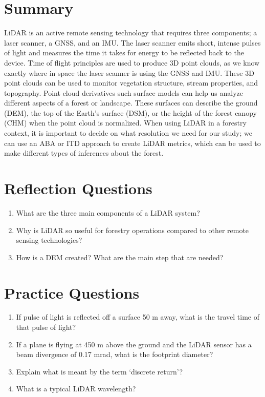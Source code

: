\documentclass[
]{book}
\providecommand{\tightlist}{%
  \setlength{\itemsep}{0pt}\setlength{\parskip}{0pt}}
\begin{document}
\hypertarget{summary-7}{%
\section{Summary}\label{summary-7}}

LiDAR is an active remote sensing technology that requires three components; a laser scanner, a GNSS, and an IMU. The laser scanner emits short, intense pulses of light and measures the time it takes for energy to be reflected back to the device. Time of flight principles are used to produce 3D point clouds, as we know exactly where in space the laser scanner is using the GNSS and IMU. These 3D point clouds can be used to monitor vegetation structure, stream properties, and topography. Point cloud derivatives such surface models can help us analyze different aspects of a forest or landscape. These surfaces can describe the ground (DEM), the top of the Earth's surface (DSM), or the height of the forest canopy (CHM) when the point cloud is normalized. When using LiDAR in a forestry context, it is important to decide on what resolution we need for our study; we can use an ABA or ITD approach to create LiDAR metrics, which can be used to make different types of inferences about the forest.

\hypertarget{reflection-questions-11}{%
\section*{Reflection Questions}\label{reflection-questions-11}}

\begin{enumerate}
\def\labelenumi{\arabic{enumi}.}
\tightlist
\item
  What are the three main components of a LiDAR system?
\item
  Why is LiDAR so useful for forestry operations compared to other remote sensing technologies?
\item
  How is a DEM created? What are the main step that are needed?
\end{enumerate}

\hypertarget{practice-questions-7}{%
\section*{Practice Questions}\label{practice-questions-7}}

\begin{enumerate}
\def\labelenumi{\arabic{enumi}.}
\tightlist
\item
  If pulse of light is reflected off a surface 50 m away, what is the travel time of that pulse of light?
\item
  If a plane is flying at 450 m above the ground and the LiDAR sensor has a beam divergence of 0.17 mrad, what is the footprint diameter?
\item
  Explain what is meant by the term `discrete return'?
\item
  What is a typical LiDAR wavelength?
\end{enumerate}
\end{document}
